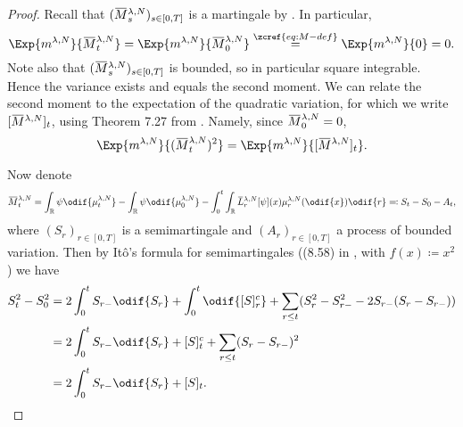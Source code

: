 \begin{proof}
  Recall that \((\ol{M}_s^{\lambda,N})_{s\in[0,T]}\) is a martingale by .
  In particular,
  \begin{equation}
    \Exp{\lawmu^{\lambda,N}}{\ol{M}_t^{\lambda,N}} = \Exp{\lawmu^{\lambda,N}}{\ol{M}_0^{\lambda,N}}
    \overset{\zcref{eq:M-def}}{=} \Exp{\lawmu^{\lambda,N}}{0} = 0.
  \end{equation}
  Note also that \((\ol{M}_s^{\lambda,N})_{s\in[0,T]}\) is bounded, so in particular square integrable.
  Hence the variance exists and equals the second moment.
  We can relate the second moment to the expectation of the quadratic variation, for which we write \(\sbr{\ol{M}^{\lambda,N}}_t\), using Theorem 7.27 from \cite[201]{klebanerIntroductionStochasticCalculus2012}.
  Namely, since \(\ol{M}_0^{\lambda,N} = 0\),
  \begin{equation}
    \Exp{\lawmu^{\lambda,N}}{(\ol{M}_t^{\lambda,N})^2} = \Exp{\lawmu^{\lambda,N}}{\sbr{\ol{M}^{\lambda,N}}_t}.
  \end{equation}

  Now denote
  \begin{equation}\label{eq:M=S-A}
    \ol{M}_t^{\lambda,N} = \int_\potspace \psi \odif{\mu_t^{\lambda, N}} - \int_\potspace \psi \odif{\mu_0^{\lambda, N}} - \int_0^t \int_\potspace \ol{L}_r^{\lambda, N} [\psi](x) \mu_{r}^{\lambda, N}(\odif{x}) \odif{r}
    \eqqcolon S_t - S_0 - A_t,
  \end{equation}
  where \((S_r)_{r\in[0,T]}\) is a semimartingale and \((A_r)_{r\in[0,T]}\) a process of bounded variation.
  Then by Itô's formula for semimartingales ((8.58) in \cite[236]{klebanerIntroductionStochasticCalculus2012}, with \(f(x) \coloneqq x^2\)) we have
  \begin{equation}\label{eq:S^2-q-var-rel}
    \begin{split}
      S_t^2 - S_0^2
       & = 2 \int_0^t S_{r-} \odif{S_r} + \int_0^t \odif{\sbr{S}_r^c}
      + \sum_{r \leq t} \br{ S_r^2 - S_{r-}^2  - 2 S_{r-} (S_r - S_{r-}) } \\
       & = 2 \int_0^t S_{r-} \odif{S_r} + \sbr{S}_t^c
      + \sum_{r \leq t} \br{ S_r - S_{r-} }^2                              \\
       & = 2 \int_0^t S_{r-} \odif{S_r} + \sbr{S}_t.
    \end{split}
  \end{equation}


\end{proof}
